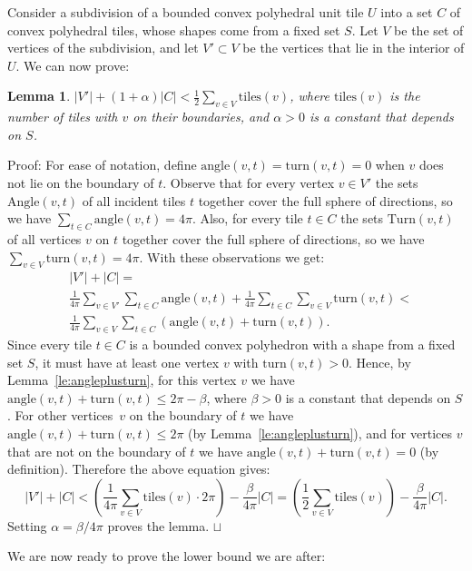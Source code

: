 \documentclass[11pt,a4paper]{article}
\newcommand{\unittile}{\ensuremath{U}\xspace}
\newcommand{\tdegr}{\mathrm{tiles}}
\newcommand{\angl}{\mathrm{angle}}
\newcommand{\turn}{\mathrm{turn}}
\newcommand{\Angl}{\mathrm{Angle}}
\newcommand{\Turn}{\mathrm{Turn}}
\newtheorem{lemma}{Lemma}
\newenvironment{proof}{Proof:}{\qed}
\def\squareforqed{\hbox{\rlap{$\sqcap$}$\sqcup$}}
\def\qed{\ifmmode\squareforqed\else{\unskip\nobreak\hfil
\penalty50\hskip1em\null\nobreak\hfil\squareforqed
\parfillskip=0pt\finalhyphendemerits=0\endgraf}\fi}
\begin{document}
Consider a subdivision of a bounded convex polyhedral unit tile $\unittile$ into a set $C$ of convex polyhedral tiles, whose shapes come from a fixed set $S$. Let $V$ be the set of vertices of the subdivision, and let $V' \subset V$ be the vertices that lie in the interior of $\unittile$. We can now prove:
\begin{lemma}\label{le:3dvertextileincidences}
$|V'| + (1+\alpha)|C| < \frac12 \sum_{v \in V} \tdegr(v)$, where $\tdegr(v)$ is the number of tiles with $v$ on their boundaries, and $\alpha > 0$ is a constant that depends on $S$.
\end{lemma}
\begin{proof}
For ease of notation, define $\angl(v,t) = \turn(v,t) = 0$ when $v$ does not lie on the boundary of $t$. Observe that for every vertex $v \in V'$ the sets $\Angl(v,t)$ of all incident tiles $t$ together cover the full sphere of directions, so we have $\sum_{t \in C} \angl(v,t) = 4\pi$. Also, for every tile $t \in C$ the sets $\Turn(v,t)$ of all vertices $v$ on $t$ together cover the full sphere of directions, so we have $\sum_{v \in V} \turn(v,t) = 4\pi$. With these observations we get:
\begin{eqnarray*}
& |V'| + |C|
= \\
& \frac1{4\pi} \sum_{v \in V'} \sum_{t \in C} \angl(v,t) + \frac1{4\pi} \sum_{t \in C}  \sum_{v \in V} \turn(v,t) < \\
& \frac1{4\pi} \sum_{v \in V} \sum_{t \in C} \left(\angl(v,t) + \turn(v,t)\right).
\end{eqnarray*}
Since every tile $t \in C$ is a bounded convex polyhedron with a shape from a fixed set $S$, it must have at least one vertex $v$ with $\turn(v,t) > 0$. Hence, by Lemma~\ref{le:angleplusturn}, for this vertex $v$ we have $\angl(v,t) + \turn(v,t) \leq 2\pi - \beta$, where $\beta > 0$ is a constant that depends on $S$. For other vertices~$v$ on the boundary of $t$ we have $\angl(v,t) + \turn(v,t) \leq 2\pi$ (by Lemma~\ref{le:angleplusturn}), and for vertices $v$ that are not on the boundary of $t$ we have $\angl(v,t) + \turn(v,t) = 0$ (by definition). Therefore the above equation gives:\[
|V'| + |C| <
\left(\frac1{4\pi} \sum_{v \in V} \tdegr(v)\cdot 2\pi\right) - \frac\beta{4\pi}|C| =
\left(\frac12 \sum_{v \in V} \tdegr(v)\right) - \frac\beta{4\pi}|C|.
\]
Setting $\alpha = \beta/4\pi$ proves the lemma.
\end{proof}

We are now ready to prove the lower bound we are after:
\end{document}
